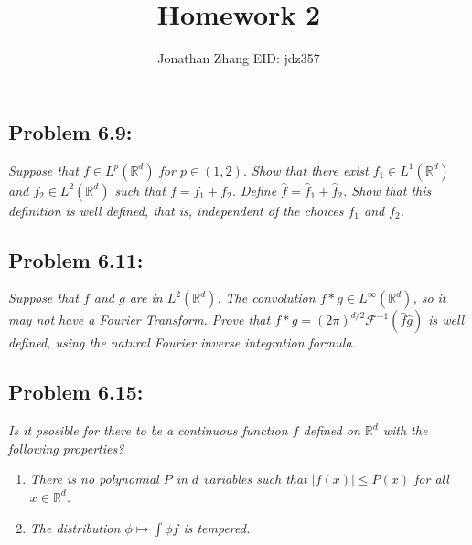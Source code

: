 \documentclass[letterpaper,twoside,11pt]{article}
\theoremstyle{mystyle}
\newcommand{\R}{{\mathbb R}}
\begin{document}
\title{\vspace{-2\baselineskip} 
Homework 2
}
\author{Jonathan Zhang \qquad EID: { jdz357} }
\date{}
\maketitle


\subsection*{Problem 6.9:}
\textit{
Suppose that $f\in L^p\left( \R^d \right)$ for $p \in \left( 1, 2 \right)$. Show that there exist $f_1 \in L^1\left( \R^d \right)$ and $f_2 \in L^2\left( \R^d \right)$ such that $f = f_1 + f_2$. 
Define $\hat f = \hat f_1 + \hat f_2$. Show that this definition is well defined, that is, independent of the choices $f_1$ and $f_2$. }






\subsection*{Problem 6.11:}
\textit{Suppose that $f$ and $g$ are in $L^2\left( \R^d \right)$. The convolution $f \ast g \in L^\infty\left( \R^d \right)$, so it may not have a Fourier Transform. Prove that $f \ast g = \left( 2\pi  \right)^{d/2}\mathcal F^{-1} \left( \hat f \hat g \right)$ is well defined, using the natural Fourier inverse integration formula. }


\subsection*{Problem 6.15:}
\textit{Is it psosible for there to be a continuous function $f$ defined on $\R^d$ with the following properties?}
\begin{enumerate}
  \item \textit{There is no polynomial $P$ in $d$ variables such that $|f(x)| \leq P(x)$ for all $x\in \R^d$.} 
  \item \textit{The distribution $\phi \mapsto \int \phi f$ is tempered.}
\end{enumerate}
\end{document}
